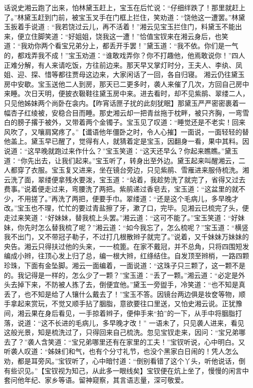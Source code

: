 \documentclass[12pt,oneside]{book}
\begin{document}
话说史湘云跑了出来，怕林黛玉赶上，宝玉在后忙说：“仔细绊跌了！那里就赶上了。”林黛玉赶到门前，被宝玉叉手在门框上拦住，笑劝道：“饶他这一遭罢。”林黛玉扳着手说道﹕“我若饶过云儿，再不活着！”湘云见宝玉拦住门，料黛玉不能出来，便立住脚笑道：“好姐姐，饶我这一遭！”恰值宝钗来在湘云身后，也笑道：“我劝你两个看宝兄弟分上，都丢开手罢！”黛玉道：“我不依。你们是一气的，都戏弄我不成！”宝玉劝道：“谁敢戏弄你？你不打趣他，他焉敢说你！”四人正难分解，有人来请吃饭，方往前边来。那天早又掌灯时分，王夫人、李纨、凤姐、迎、探、惜等都往贾母这边来，大家闲话了一回，各自归寝。
湘云仍往黛玉房中安歇。宝玉送他二人到房，那天已二更多时，袭人来催了几次，方回自己房中来睡。次日天明，便披衣靸鞋往黛玉房中来。进去看时，却不见紫鹃、翠缕二人，只见他姊妹两个尚卧在衾内。【昨宵话匣子扰的此刻犹眠】那黛玉严严密密裹着一幅杏子红绫被，安稳合目而睡。那史湘云却一把青丝拖于枕畔，被只齐胸，一弯雪白的膀子撂于被外，又带着两个金镯子。宝玉见了叹道：“睡觉还是不老实！回来风吹了，又嚷肩窝疼了。”【谶语他年僵卧之时，令人心摧】一面说，一面轻轻的替他盖上。黛玉早已醒了，觉得有人，就猜着定是宝玉，因翻身一看，果中其料。因说道：“这早晚就跑过来作什么？”宝玉笑道：“这天还早么？你起来瞧瞧。”黛玉道：“你先出去，让我们起来。”宝玉听了，转身出至外边。黛玉起来叫醒湘云，二人都穿了衣服。宝玉复又进来，坐在镜台旁边，只见紫鹃、雪雁进来服侍梳洗。湘云洗了面，翠缕便拿残水要泼，宝玉道：“站着，我趁势洗了就完了，省得又过去费事。”说着便走过来，弯腰洗了两把。紫鹃递过香皂去，宝玉道：“这盆里的就不少，不用搓了。”再洗了两把，便要手巾。翠缕道：“还是这个毛病儿，多早晚才改。”宝玉也不理，忙忙的要过青盐擦了牙，漱了口，完毕。见湘云已梳完了头，便走过来笑道：“好妹妹，替我梳上头罢。”湘云道：“这可不能了。”宝玉笑道：“好妹妹，你先时怎么替我梳了呢？”湘云道：“如今我忘了，怎么梳呢？”宝玉道：“横竖我不出门，又不带冠子勒子，不过打几根散辫子就完了。”说着，又千妹妹万妹妹的央告。湘云只得扶过他的头来，一一梳篦。在家不戴冠，并不总角，只将四围短发编成小辫，往顶心发上归了总，编一根大辫，红绦结住。自发顶至辫梢，一路四颗珍珠，下面有金坠脚。湘云一面编着，一面说道：“这珠子只三颗了，这一颗不是的。我记得是一样的，怎么少了一颗？”宝玉道：“丢了一颗。”湘云道：“必定是外头去掉下来，不防被人拣了去，倒便宜他。”黛玉一旁盥手，冷笑道：“也不知是真丢了，也不知是给了人镶什么戴去了！”宝玉不答。因镜台两边俱是妆奁等物，顺手拿起来赏玩，不觉又顺手拈了胭脂，意欲要往口里送，又怕史湘云说。正犹豫间，湘云果在身后看见，一手掠着辫子，便伸手来“拍”的一下，从手中将胭脂打落，说道：“这不长进的毛病儿，多早晚才改！”
一语未了，只见袭人进来，看见这般光景，知是梳洗过了，只得回来自己梳洗。忽见宝钗走来，因问：“宝兄弟哪去了？”袭人含笑道：“宝兄弟哪里还有在家里的工夫！”宝钗听说，心中明白。又听袭人叹道：“姊妹们和气，也有个分寸礼节，也没个黑家白日闹的！凭人怎么劝，都是耳旁风。”宝钗听了，心中暗忖道：“倒别看错了这个丫头，听他说话，倒有些识见。”【宝钗视为知己，从此多一眼线矣】宝钗便在炕上坐了，慢慢的闲言中套问他年纪、家乡等语。留神窥察，其言语志量，深可敬爱。
\end{document}
